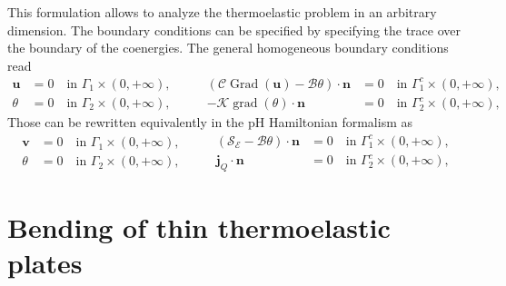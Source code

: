 \documentclass[11t]{article}
\DeclareMathOperator*{\grad}{grad}
\DeclareMathOperator*{\Grad}{Grad}
\begin{document}
This formulation allows to analyze the thermoelastic problem in an arbitrary dimension. The boundary conditions can be specified by specifying the trace over the boundary of the coenergies. The general homogeneous boundary conditions read 
\begin{equation}
\begin{aligned}
\bm{u} &= 0 \quad \text{in } \Gamma_1 \times (0, +\infty), \\
\theta &= 0 \quad \text{in } \Gamma_2 \times (0, +\infty),
\end{aligned} \qquad
\begin{aligned}
\left(\mathcal{C} \Grad(\bm{u}) - \mathcal{B} \theta \right) \cdot \bm{n} &= 0 \quad \text{in } \Gamma_1^c \times (0, +\infty), \\
- \mathcal{K} \grad(\theta) \cdot \bm{n} &= 0 \quad \text{in } \Gamma_2^c \times (0, +\infty),
\end{aligned}
\end{equation}
Those can be rewritten equivalently in the pH Hamiltonian formalism as
\begin{equation}
\begin{aligned}
\bm{v} &= 0 \quad \text{in } \Gamma_1 \times (0, +\infty), \\
\theta &= 0 \quad \text{in } \Gamma_2 \times (0, +\infty),
\end{aligned} \qquad
\begin{aligned}
\left(\mathcal{S_E} - \mathcal{B} \theta \right) \cdot \bm{n} &= 0 \quad \text{in } \Gamma_1^c \times (0, +\infty), \\
\bm{j}_Q \cdot \bm{n} &= 0 \quad \text{in } \Gamma_2^c \times (0, +\infty),
\end{aligned}
\end{equation}

\section{Bending of thin thermoelastic plates}
\end{document}
